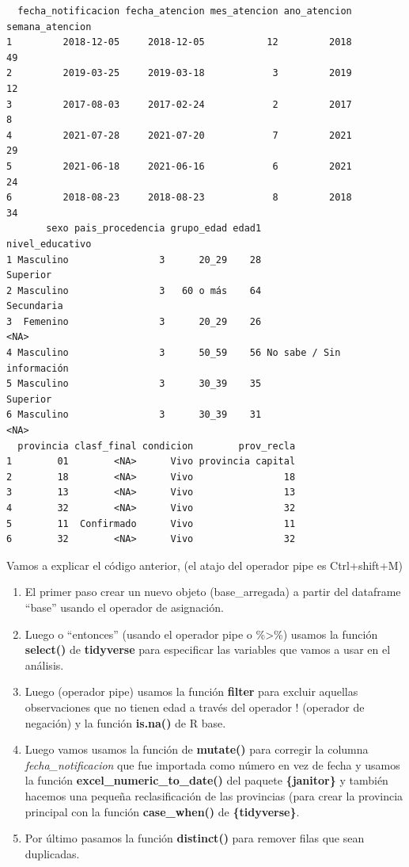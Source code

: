 \documentclass[
  letterpaper,
  DIV=11,
  numbers=noendperiod]{scrreprt}
\begin{document}
\begin{verbatim}
  fecha_notificacion fecha_atencion mes_atencion ano_atencion semana_atencion
1         2018-12-05     2018-12-05           12         2018              49
2         2019-03-25     2019-03-18            3         2019              12
3         2017-08-03     2017-02-24            2         2017               8
4         2021-07-28     2021-07-20            7         2021              29
5         2021-06-18     2021-06-16            6         2021              24
6         2018-08-23     2018-08-23            8         2018              34
       sexo pais_procedencia grupo_edad edad1           nivel_educativo
1 Masculino                3      20_29    28                  Superior
2 Masculino                3   60 o más    64                Secundaria
3  Femenino                3      20_29    26                      <NA>
4 Masculino                3      50_59    56 No sabe / Sin información
5 Masculino                3      30_39    35                  Superior
6 Masculino                3      30_39    31                      <NA>
  provincia clasf_final condicion        prov_recla
1        01        <NA>      Vivo provincia capital
2        18        <NA>      Vivo                18
3        13        <NA>      Vivo                13
4        32        <NA>      Vivo                32
5        11  Confirmado      Vivo                11
6        32        <NA>      Vivo                32
\end{verbatim}

Vamos a explicar el código anterior, (el atajo del operador pipe es
Ctrl+shift+M)

\begin{enumerate}
\def\labelenumi{\arabic{enumi}.}
\item
  El primer paso crear un nuevo objeto (base\_arregada) a partir del
  dataframe ``base'' usando el operador de asignación.
\item
  Luego o ``entonces'' (usando el operador pipe o \%\textgreater\%)
  usamos la función \textbf{select()} de \textbf{tidyverse} para
  especificar las variables que vamos a usar en el análisis.
\item
  Luego (operador pipe) usamos la función \textbf{filter} para excluir
  aquellas observaciones que no tienen edad a través del operador !
  (operador de negación) y la función \textbf{is.na()} de R base.
\item
  Luego vamos usamos la función de \textbf{mutate()} para corregir la
  columna \emph{fecha\_notificacion} que fue importada como número en
  vez de fecha y usamos la función \textbf{excel\_numeric\_to\_date()}
  del paquete \textbf{\{janitor\}} y también hacemos una pequeña
  reclasificación de las provincias (para crear la provincia principal
  con la función \textbf{case\_when()} de \textbf{\{tidyverse\}}.
\item
  Por último pasamos la función \textbf{distinct()} para remover filas
  que sean duplicadas.
\end{enumerate}
\end{document}
